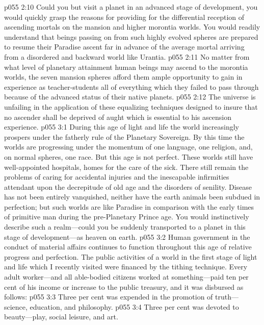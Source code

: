 \vs p055 2:10 Could you but visit a planet in an advanced stage of development, you would quickly grasp the reasons for providing for the differential reception of ascending mortals on the mansion and higher morontia worlds. You would readily understand that beings passing on from such highly evolved spheres are prepared to resume their Paradise ascent far in advance of the average mortal arriving from a disordered and backward world like Urantia.
\vs p055 2:11 No matter from what level of planetary attainment human beings may ascend to the morontia worlds, the seven mansion spheres afford them ample opportunity to gain in experience as teacher\hyp{}students all of everything which they failed to pass through because of the advanced status of their native planets.
\vs p055 2:12 The universe is unfailing in the application of these equalizing techniques designed to insure that no ascender shall be deprived of aught which is essential to his ascension experience.
\vs p055 3:1 During this age of light and life the world increasingly prospers under the fatherly rule of the Planetary Sovereign. By this time the worlds are progressing under the momentum of one language, one religion, and, on normal spheres, one race. But this age is not perfect. These worlds still have well\hyp{}appointed hospitals, homes for the care of the sick. There still remain the problems of caring for accidental injuries and the inescapable infirmities attendant upon the decrepitude of old age and the disorders of senility. Disease has not been entirely vanquished, neither have the earth animals been subdued in perfection; but such worlds are like Paradise in comparison with the early times of primitive man during the pre\hyp{}Planetary Prince age. You would instinctively describe such a realm---could you be suddenly transported to a planet in this stage of development---as heaven on earth.\plusone
\pc \vs p055 3:2 Human government in the conduct of material affairs continues to function throughout this age of relative progress and perfection. The public activities of a world in the first stage of light and life which I recently visited were financed by the tithing technique. Every adult worker---and all able\hyp{}bodied citizens worked at something---paid ten per cent of his income or increase to the public treasury, and it was disbursed as follows:
\pc \vs p055 3:3 \bibnobreakspace Three per cent was expended in the promotion of truth---science, education, and philosophy.
\pc \vs p055 3:4 \bibnobreakspace Three per cent was devoted to beauty---play, social leisure, and art.
